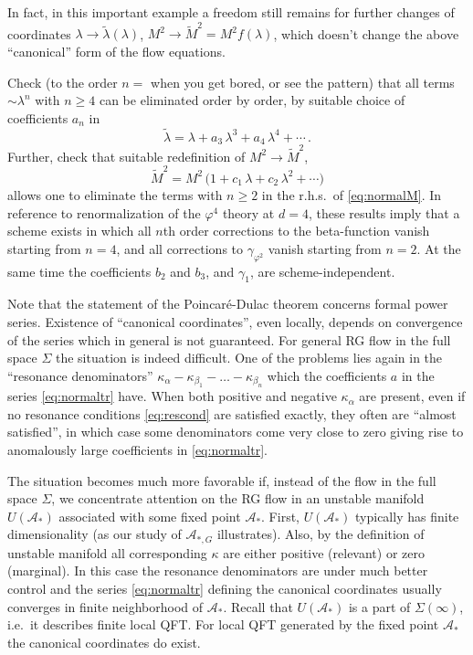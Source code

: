 \begin{remark}
In fact, in this important example a freedom still remains for further changes of
coordinates $\lambda\to\tilde\lambda(\lambda)$, $M^2\to\tilde M^2=M^2f(\lambda)$,
which doesn't change the above ``canonical'' form of the flow equations.
\end{remark}

\begin{exercise}
Check (to the order $n=$ when you get bored, or see the pattern) that all terms
$\sim\lambda^n$ with $n\ge4$ can be eliminated order by order, by suitable choice
of coefficients $a_n$ in
\[
\tilde\lambda=\lambda+a_3\,\lambda^3+a_4\,\lambda^4+\cdots\,.
\]
Further, check that suitable redefinition of $M^2\to\tilde M^2$,
\[
\tilde M^2=M^2\,\bigl(1+c_1\,\lambda+c_2\,\lambda^2+\cdots\bigr)
\]
allows one to eliminate the terms with $n\ge2$ in the r.h.s.\ of
\eqref{eq:normalM}. In reference to renormalization of the $\varphi^4$ theory at
$d=4$, these results imply that a scheme exists in which all $n$th order
corrections to the beta-function vanish starting from $n=4$, and all corrections
to $\gamma_{\varphi^2}$ vanish starting from $n=2$. At the same time the
coefficients $b_2$ and $b_3$, and $\gamma_1$, are scheme-independent.
\end{exercise}

Note that the statement of the Poincar\'e-Dulac theorem concerns formal power
series. Existence of ``canonical coordinates'', even locally, depends on
convergence of the series which in general is not guaranteed. For general RG flow
in the full space $\Sigma$ the situation is indeed difficult. One of the problems
lies again in the ``resonance denominators''
$\kappa_\alpha-\kappa_{\beta_1}-\dots-\kappa_{\beta_n}$ which the coefficients $a$
in the series \eqref{eq:normaltr} have. When both positive and negative
$\kappa_\alpha$ are present, even if no resonance conditions \eqref{eq:rescond} are
satisfied exactly, they often are ``almost satisfied'', in which case some
denominators come very close to zero giving rise to anomalously large coefficients
in \eqref{eq:normaltr}.

The situation becomes much more favorable if, instead of the flow in the full
space $\Sigma$, we concentrate attention on the RG flow in an unstable manifold
$U(\mathcal A_*)$ associated with some fixed point $\mathcal A_*$. First,
$U(\mathcal A_*)$ typically has finite dimensionality (as our study of
$\mathcal A_{*,G}$ illustrates). Also, by the definition of unstable manifold all
corresponding $\kappa$ are either positive (relevant) or zero (marginal). In this
case the resonance denominators are under much better control and the series
\eqref{eq:normaltr} defining the canonical coordinates usually converges in finite
neighborhood of $\mathcal A_*$. Recall that $U(\mathcal A_*)$ is a part of
$\Sigma(\infty)$, i.e.\ it describes finite local QFT. For local QFT generated by
the fixed point $\mathcal A_*$ the canonical coordinates do exist.

